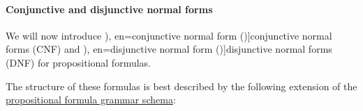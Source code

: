 \paragraph{Conjunctive and disjunctive normal forms}

\begin{definition}\label{def:propositional_cnf_and_dnf}\mimprovised
  We will now introduce \term[ru=конъюнктивная нормальная форма (\cite[def. 6.2]{Эдельман1975Логика}), en=conjunctive normal form (\cite[def. 1.3.10]{Hinman2005Logic})]{conjunctive normal forms} (CNF) and \term[ru=дизъюнктивная нормальная форма (\cite[def. 6.2]{Эдельман1975Логика}), en=disjunctive normal form (\cite[def. 1.3.10]{Hinman2005Logic})]{disjunctive normal forms} (DNF) for propositional formulas.

  The structure of these formulas is best described by the following extension of the \hyperref[def:propositional_formula]{propositional formula grammar schema}:
  \begin{longbnf*}
           {} \\
           {\bnftsq{\( \synneg \)} \bnfsp {}} \\
                    { \bnfor {}} \\
     { \bnfor {} \bnfor} \\
     \\
                        { \bnfor \bnftsq{(} \bnfsp {}              \bnfsp \bnftsq{\( \synwedge \)} \bnfsp {}             \bnfsp \bnftsq{)}} \\
     { \bnfor {} \bnfor} \\
     \\
                        { \bnfor \bnftsq{(} \bnfsp {}              \bnfsp \bnftsq{\( \synvee \)}   \bnfsp {}             \bnfsp \bnftsq{)}}
  \end{longbnf*}
\end{definition}
